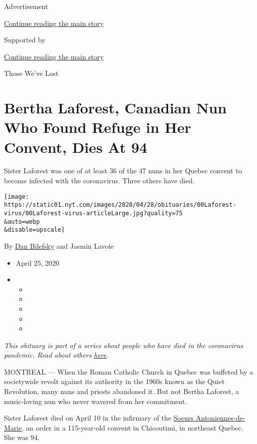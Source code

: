 Advertisement

\protect\hyperlink{after-top}{Continue reading the main story}

Supported by

\protect\hyperlink{after-sponsor}{Continue reading the main story}

Those We've Lost

\hypertarget{bertha-laforest-canadian-nun-who-found-refuge-in-her-convent-dies-at-94}{%
\section{Bertha Laforest, Canadian Nun Who Found Refuge in Her Convent,
Dies At
94}\label{bertha-laforest-canadian-nun-who-found-refuge-in-her-convent-dies-at-94}}

Sister Laforest was one of at least 36 of the 47 nuns in her Quebec
convent to become infected with the coronavirus. Three others have died.

\texttt{[image: https://static01.nyt.com/images/2020/04/28/obituaries/00Laforest-virus/00Laforest-virus-articleLarge.jpg?quality=75\\\&auto=webp\\\&disable=upscale]}

By \href{https://www.nytimes.com/by/dan-bilefsky}{Dan Bilefsky} and
Jasmin Lavoie

\begin{itemize}
\item
  April 25, 2020
\item
  \begin{itemize}
  \item
  \item
  \item
  \item
  \item
  \end{itemize}
\end{itemize}

\emph{This obituary is part of a series about people who have died in
the coronavirus pandemic. Read about others}
\href{https://www.nytimes.com/series/people-who-have-died-of-the-coronavirus}{\emph{here}}\emph{.}

MONTREAL --- When the Roman Catholic Church in Quebec was buffeted by a
societywide revolt against its authority in the 1960s known as the Quiet
Revolution, many nuns and priests abandoned it. But not Bertha Laforest,
a music-loving nun who never wavered from her commitment.

Sister Laforest died on April 10 in the infirmary of the
\href{https://soeursantoniennes.org/}{Soeurs Antoniennes-de-Marie}, an
order in a 115-year-old convent in Chicoutimi, in northeast Quebec. She
was 94.


